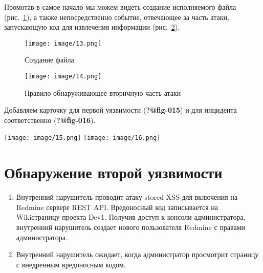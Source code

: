 \documentclass[
  12pt,
  a4paper,
  DIV=11,
  numbers=noendperiod]{scrreprt}
\providecommand{\tightlist}{%
  \setlength{\itemsep}{0pt}\setlength{\parskip}{0pt}}\usepackage{longtable,booktabs,array}
\begin{document}
Промотав в самое начало мы можем видеть создание исполняемого файла
(рис.~\ref{fig-013}), а также непосредственно событие, отвечающее за
часть атаки, запускающую код для извлечения информации
(рис.~\ref{fig-014}).

\begin{figure}

{\centering \texttt{[image: image/13.png]}

}

\caption{\label{fig-013}Создание файла}

\end{figure}

\begin{figure}

{\centering \texttt{[image: image/14.png]}

}

\caption{\label{fig-014}Правило обнаруживающее вторичную часть атаки}

\end{figure}

Добавляем карточку для первой уязвимости (\textbf{?@fig-015}) и для
инцидента соответственно (\textbf{?@fig-016}).

\texttt{[image: image/15.png]}
\texttt{[image: image/16.png]}

\hypertarget{ux43eux431ux43dux430ux440ux443ux436ux435ux43dux438ux435-ux432ux442ux43eux440ux43eux439-ux443ux44fux437ux432ux438ux43cux43eux441ux442ux438}{%
\section{Обнаружение второй
уязвимости}\label{ux43eux431ux43dux430ux440ux443ux436ux435ux43dux438ux435-ux432ux442ux43eux440ux43eux439-ux443ux44fux437ux432ux438ux43cux43eux441ux442ux438}}

\begin{enumerate}
\def\labelenumi{\arabic{enumi}.}
\setcounter{enumi}{3}
\tightlist
\item
  Внутренний нарушитель проводит атаку stored XSS для включения на
  Redmine сервере REST API. Вредоносный код записывается на Wikiстраницу
  проекта Dev1. Получив доступ к консоли администратора, внутренний
  нарушитель создает нового пользователя Redmine с правами
  администратора.
\item
  Внутренний нарушитель ожидает, когда администратор просмотрит страницу
  с внедренным вредоносным кодом.
\end{enumerate}
\end{document}
